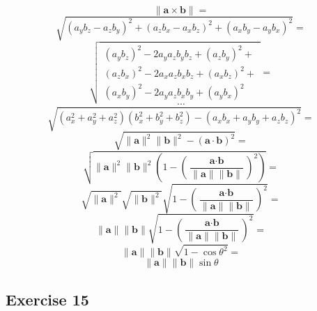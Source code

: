 \documentclass[11pt]{article}
\begin{document}
$$\|\textbf{a} \times \textbf{b}\|=$$
$$\sqrt{(a_yb_z-a_zb_y)^2+(a_zb_x-a_xb_z)^2+(a_xb_y-a_yb_x)^2}=$$
$$
\sqrt{
\begin{split}
(a_yb_z)^2-2a_ya_zb_yb_z+(a_zb_y)^2 + \\
(a_zb_x)^2-2a_xa_zb_xb_z+(a_xb_z)^2 + \\
(a_xb_y)^2-2a_ya_zb_xb_y+(a_yb_x)^2
\end{split}
}=
$$
$$\cdots{}$$
$$\sqrt{(a_x^2+a_y^2+a_z^2)(b_x^2+b_y^2+b_z^2)-(a_xb_x+a_yb_y+a_zb_z)^2}=$$
$$\sqrt{\|\textbf{a}\|^2\|\textbf{b}\|^2-\left(\textbf{a}\cdot{}\textbf{b}\right)^2}=$$
$$\sqrt{\|\textbf{a}\|^2\|\textbf{b}\|^2\left(1-\left(\frac{\textbf{a}\cdot{}\textbf{b}}{\|\textbf{a}\|\|\textbf{b}\|}\right)^2\right)}=$$
$$\sqrt{\|\textbf{a}\|^2}\sqrt{\|\textbf{b}\|^2}\sqrt{1-\left(\frac{\textbf{a}\cdot{}\textbf{b}}{\|\textbf{a}\|\|\textbf{b}\|}\right)^2}=$$
$$\|\textbf{a}\|\|\textbf{b}\|\sqrt{1-\left(\frac{\textbf{a}\cdot{}\textbf{b}}{\|\textbf{a}\|\|\textbf{b}\|}\right)^2}=$$
$$\|\textbf{a}\|\|\textbf{b}\|\sqrt{1-\cos\theta^2}=$$
$$\|\textbf{a}\|\|\textbf{b}\|\sin\theta$$

\subsection{Exercise 15}
\end{document}
